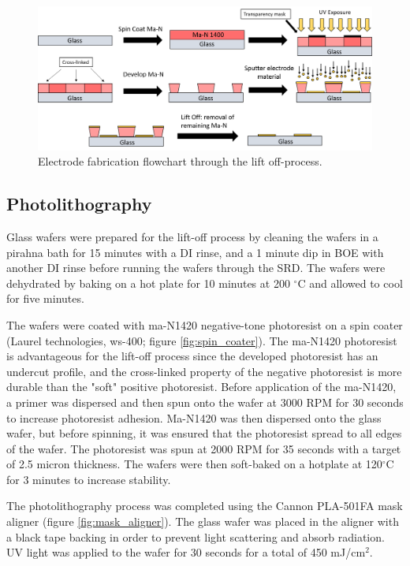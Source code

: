   \begin{figure}
     \centering
     \includegraphics[width=\textwidth]{images/electrodeFabrication.png}
     \caption{Electrode fabrication flowchart through the lift off-process.}
     \label{fig:lift_off}
 \end{figure}

\subsection*{Photolithography}

\par Glass wafers were prepared for the lift-off process by cleaning the wafers in a pirahna bath for 15 minutes with a DI rinse, and a 1 minute dip in BOE with another DI rinse before running the wafers through the SRD. The wafers were dehydrated by baking on a hot plate for 10 minutes at 200 $^\circ$C and allowed to cool for five minutes. 


\par The wafers were coated with ma-N1420 negative-tone photoresist on a spin coater (Laurel technologies, ws-400; figure \ref{fig:spin_coater}). The ma-N1420 photoresist is advantageous for the lift-off process since the developed photoresist has an undercut profile, and the cross-linked property of the negative photoresist is more durable than the "soft" positive photoresist. Before application of the ma-N1420, a primer was dispersed and then spun onto the wafer at 3000 RPM for 30 seconds to increase photoresist adhesion. Ma-N1420 was then dispersed onto the glass wafer, but before spinning, it was ensured that the photoresist spread to all edges of the wafer. The photoresist was spun at 2000 RPM for 35 seconds with a target of 2.5 micron thickness. The wafers were then soft-baked on a hotplate at 120$^\circ$C for 3 minutes to increase stability. 

\par The photolithography process was completed using the Cannon PLA-501FA mask aligner (figure \ref{fig:mask_aligner}). The glass wafer was placed in the aligner with a black tape backing in order to prevent light scattering and absorb radiation. UV light was applied to the wafer for 30 seconds for a total of 450 mJ/cm$^2$. 

